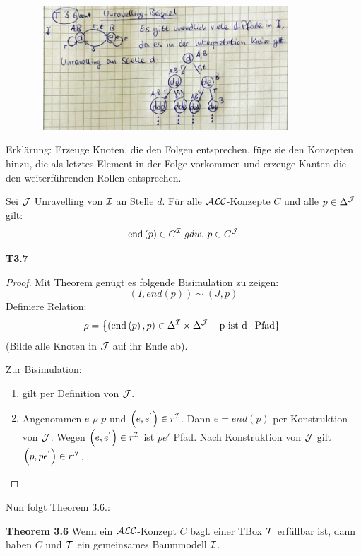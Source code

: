 \includegraphics[width=4.71910in,height=1.83200in]{media/36unraveling.png}

Erklärung: Erzeuge Knoten, die den Folgen entsprechen, füge sie den
Konzepten hinzu, die als letztes Element in der Folge vorkommen und
erzeuge Kanten die den weiterführenden Rollen entsprechen.

\begin{lemma}\label{lemma37}
Sei $\mathcal{J}$ Unravelling von $\mathcal{I}$ an Stelle $d$. Für alle $\mathcal{A}\mathcal{L}\mathcal{C}$-Konzepte $C$ und alle $p \in \Delta^{\mathcal{J}}$ gilt:
$$\text{end}\left( p \right) \in C^{\MI}\ gdw.\ p \in C^{\MJ}$$
\end{lemma}

\textbf{T3.7}

\begin{proof}
Mit Theorem genügt es folgende Bisimulation zu zeigen:
$$\left( I,end\left( p \right) \right)\sim\left( J,p \right)$$ Definiere Relation: $$\rho = \left\{ \left( \text{end}\left( p \right),p \right) \in \Delta^{\mathcal{I}} \times \Delta^{\mathcal{J}}\  \right|\text{\ p\ }\mathrm{\text{ist}}\text{\ d}\mathrm{- Pfad}\}\ $$(Bilde
alle Knoten in $\mathcal{J}$ auf ihr Ende ab). 

Zur Bisimulation:

\begin{enumerate}
\def\labelenumi{\arabic{enumi}.}
\item
  gilt per Definition von $\mathcal{J}$.
\item
  Angenommen $e$ $\rho$ $p$ und
  $\left( e,e^{'} \right) \in r^{\mathcal{I}}$. Dann $e = end\left( p \right)$
  per Konstruktion von $\mathcal{J}$. Wegen $\left( e,e^{'} \right) \in r^{\mathcal{I}}$
  ist $pe'$ Pfad. Nach Konstruktion von $\mathcal{J}$ gilt
  $\left( p,pe^{'} \right) \in r^{\mathcal{J}}$.
\end{enumerate}
\end{proof}

Nun folgt Theorem 3.6.:

\textbf{Theorem 3.6} Wenn ein $\mathcal{A}\mathcal{L}\mathcal{C}$-Konzept $C$ bzgl. einer TBox $\mathcal{T}$ erfüllbar ist, dann haben $C$ und $\mathcal{T}$ ein gemeinsames Baummodell $\mathcal{I}$.


